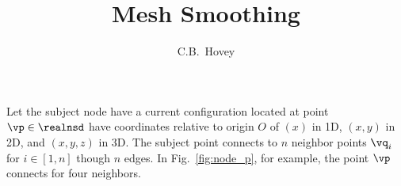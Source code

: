\documentclass[11pt, oneside]{article}   	%
\title{Mesh Smoothing}
\author{C.B.~Hovey}
\begin{document}
\maketitle


% 
% 
% 
% 


Let the subject node have a current configuration located at 
point $\vp \in \realnsd$ have coordinates relative to origin $O$
of
$(x)$ in 1D, 
$(x, y)$ in 2D, 
and $(x, y, z)$ in 3D.  
The subject point connects to $n$ neighbor points
$\vq_i$ for $i \in [1, n]$ though $n$ edges.  
In Fig.~\ref{fig:node_p}, for example, the point $\vp$ connects for four 
neighbors.
\end{document}
